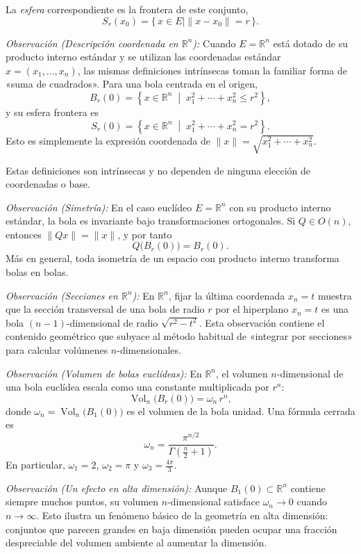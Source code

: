 La \emph{esfera} correspondiente es la frontera de este conjunto,
\[
S_r(x_0)=\{\,x\in E \mid \|x-x_0\|= r\,\}.
\]

\textit{Observación (Descripción coordenada en $\mathbb{R}^n$):}
Cuando $E=\mathbb{R}^n$ está dotado de su producto interno estándar y se
utilizan las coordenadas estándar $x=(x_1,\dots,x_n)$, las mismas definiciones
intrínsecas toman la familiar forma de «suma de cuadrados».
Para una bola centrada en el origen,
\[
B_r(0)=\left\{x\in\mathbb{R}^n\;\middle|\;x_1^2+\cdots+x_n^2\le r^2\right\},
\]
y su esfera frontera es
\[
S_r(0)=\left\{x\in\mathbb{R}^n\;\middle|\;x_1^2+\cdots+x_n^2=r^2\right\}.
\]
Esto es simplemente la expresión coordenada de
$\|x\|=\sqrt{x_1^2+\cdots+x_n^2}$.

\medskip

Estas definiciones son intrínsecas y no dependen de ninguna elección de
coordenadas o base.

\medskip

\textit{Observación (Simetría):}
En el caso euclídeo $E=\mathbb{R}^n$ con su producto interno estándar, la
bola es invariante bajo transformaciones ortogonales.
Si $Q\in O(n)$, entonces $\|Qx\|=\|x\|$, y por tanto
\[
Q\bigl(B_r(0)\bigr)=B_r(0).
\]
Más en general, toda isometría de un espacio con producto interno transforma
bolas en bolas.

\medskip

\textit{Observación (Secciones en $\mathbb{R}^n$):}
En $\mathbb{R}^n$, fijar la última coordenada $x_n=t$ muestra que la
sección transversal de una bola de radio $r$ por el hiperplano $x_n=t$ es
una bola $(n-1)$-dimensional de radio $\sqrt{r^2-t^2}$.
Esta observación contiene el contenido geométrico que subyace al método
habitual de «integrar por secciones» para calcular volúmenes $n$-dimensionales.

\medskip

\textit{Observación (Volumen de bolas euclídeas):}
En $\mathbb{R}^n$, el volumen $n$-dimensional de una bola euclídea escala como
una constante multiplicada por $r^n$:
\[
\operatorname{Vol}_n\bigl(B_r(0)\bigr)=\omega_n\,r^n,
\]
donde $\omega_n=\operatorname{Vol}_n\bigl(B_1(0)\bigr)$ es el volumen de la
bola unidad. Una fórmula cerrada es
\[
\omega_n=\frac{\pi^{n/2}}{\Gamma\!\left(\frac{n}{2}+1\right)}.
\]
En particular, $\omega_1=2$, $\omega_2=\pi$ y $\omega_3=\frac{4\pi}{3}$.

\medskip

\textit{Observación (Un efecto en alta dimensión):}
Aunque $B_1(0)\subset \mathbb{R}^n$ contiene siempre muchos puntos, su
volumen $n$-dimensional satisface $\omega_n\to 0$ cuando $n\to\infty$.
Esto ilustra un fenómeno básico de la geometría en alta dimensión: conjuntos
que parecen grandes en baja dimensión pueden ocupar una fracción despreciable
del volumen ambiente al aumentar la dimensión.

